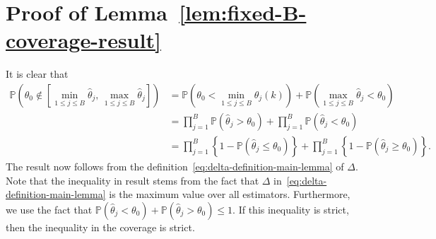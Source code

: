 \documentclass{article}
\numberwithin{myalgctr}{section}
\begin{document}
\section{Proof of Lemma~\ref{lem:fixed-B-coverage-result}}\label{appsec:fixed-B-coverage-result}
It is clear that
\begin{align*}
    \mathbb{P}\left(\theta_0 \notin \left[\min_{1\le j\le B}\widehat{\theta}_j,\,\max_{1\le j\le B}\widehat{\theta}_j\right]\right) &= \mathbb{P}\left(\theta_0 < \min_{1\le j\le B}\widehat{\theta}_j(k)\right) + \mathbb{P}\left(\max_{1\le j\le B}\widehat{\theta}_j < \theta_0\right)\\
    &= \prod_{j=1}^B \mathbb{P}(\widehat{\theta}_j > \theta_0) + \prod_{j=1}^B \mathbb{P}(\widehat{\theta}_j < \theta_0)\\
    &= \prod_{j=1}^B \left\{1 - \mathbb{P}(\widehat{\theta}_j \le \theta_0)\right\} + \prod_{j=1}^B \left\{1 - \mathbb{P}(\widehat{\theta}_j \ge \theta_0)\right\}.
\end{align*}
The result now follows from the definition~\eqref{eq:delta-definition-main-lemma} of $\Delta$. Note that the inequality in result stems from the fact that $\Delta$ in~\eqref{eq:delta-definition-main-lemma} is the maximum value over all estimators. Furthermore, we use the fact that $\mathbb{P}(\widehat{\theta}_j < \theta_0) + \mathbb{P}(\widehat{\theta}_j > \theta_0) \le 1$. If this inequality is strict, then the inequality in the coverage is strict.
\end{document}
